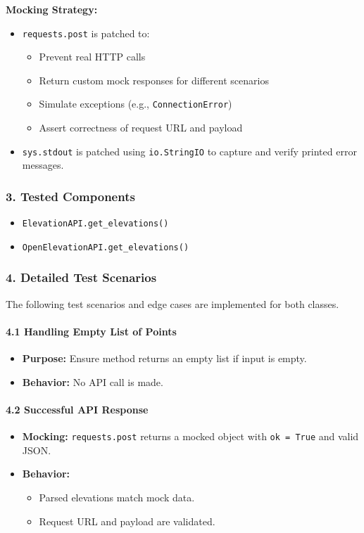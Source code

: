 \documentclass[12pt]{article}
\begin{document}
\textbf{Mocking Strategy:}
\begin{itemize}
  \item \texttt{requests.post} is patched to:
  \begin{itemize}
    \item Prevent real HTTP calls
    \item Return custom mock responses for different scenarios
    \item Simulate exceptions (e.g., \texttt{ConnectionError})
    \item Assert correctness of request URL and payload
  \end{itemize}
  \item \texttt{sys.stdout} is patched using \texttt{io.StringIO} to capture and verify printed error messages.
\end{itemize}

\subsubsection*{3. Tested Components}
\begin{itemize}
  \item \texttt{ElevationAPI.get\_elevations()}
  \item \texttt{OpenElevationAPI.get\_elevations()}
\end{itemize}

\subsubsection*{4. Detailed Test Scenarios}
The following test scenarios and edge cases are implemented for both classes.

\paragraph{4.1 Handling Empty List of Points}
\begin{itemize}
  \item \textbf{Purpose:} Ensure method returns an empty list if input is empty.
  \item \textbf{Behavior:} No API call is made.
\end{itemize}

\paragraph{4.2 Successful API Response}
\begin{itemize}
  \item \textbf{Mocking:} \texttt{requests.post} returns a mocked object with \texttt{ok = True} and valid JSON.
  \item \textbf{Behavior:}
  \begin{itemize}
    \item Parsed elevations match mock data.
    \item Request URL and payload are validated.
  \end{itemize}
\end{itemize}
\end{document}
